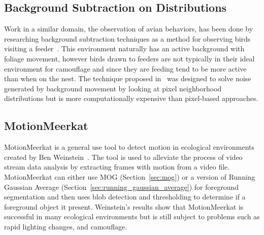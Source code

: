\subsection{Background Subtraction on Distributions}
\label{sec:ko}

Work in a similar domain, the observation of avian behaviors, has been done by researching background subtraction techniques as a method for observing birds visiting a feeder~\cite{ko_2008_background, ko_2010_warping}. This environment naturally has an active background with foliage movement, however birds drawn to feeders are not typically in their ideal environment for camouflage and since they are feeding tend to be more active than when on the nest. The technique proposed in~\cite{ko_2008_background} was designed to solve noise generated by background movement by looking at pixel neighborhood distributions but is more computationally expensive than pixel-based approaches.


\subsection{MotionMeerkat}
\label{sec:motion_meerkat}
MotionMeerkat is a general use tool to detect motion in ecological environments created by Ben Weinstein~\cite{weinstein_2014_motionmeerkat}. The tool is used to alleviate the process of video stream data analysis by extracting frames with motion from a video file. MotionMeerkat can either use MOG (Section~\ref{sec:mog}) or a version of Running Gaussian Average (Section~\ref{sec:running_gaussian_average}) for foreground segmentation and then uses blob detection and thresholding to determine if a foreground object it present. Weinstein's results show that MotionMeerkat is successful in many ecological environments but is still subject to problems such as rapid lighting changes, and camouflage.

